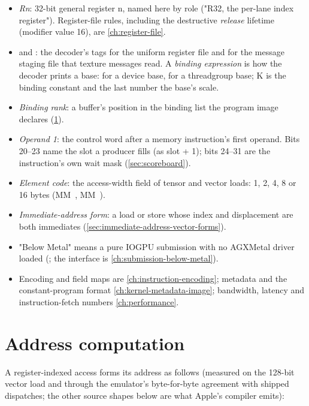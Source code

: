\begin{itemize}
\item \emph{Rn}: 32-bit general register n, named here by role ("R32, the per-lane index register"). Register-file rules,
  including the destructive \emph{release} lifetime (modifier value 16), are \cref{ch:register-file}.
\item \emph{} and \emph{}: the decoder's tags for the uniform register file and for the message staging file that texture
  messages read. A \emph{binding expression} is how the decoder prints a base:  for a device base,
   for a threadgroup base; K is the binding constant and the last number the base's scale.
\item \emph{Binding rank}: a buffer's position in the binding list the program image declares (\cref{sec:address-computation}).
\item \emph{Operand 1}: the control word after a memory instruction's first operand. Bits 20–23 name the slot a producer fills
  (as slot + 1); bits 24–31 are the instruction's own wait mask (\cref{sec:scoreboard}).
\item \emph{Element code}: the access-width field of tensor and vector loads: 1, 2, 4, 8 or 16 bytes (MM~, MM~).
\item \emph{Immediate-address form}: a load or store whose index and displacement are both immediates (\cref{sec:immediate-address-vector-forms}).
\item "Below Metal" means a pure IOGPU submission with no AGXMetal driver loaded
  (; the interface is \cref{ch:submission-below-metal}).
\item Encoding and field maps are \cref{ch:instruction-encoding}; metadata and the constant-program format \cref{ch:kernel-metadata-image}; bandwidth, latency and
  instruction-fetch numbers \cref{ch:performance}.
\end{itemize}

\section{Address computation}\label{sec:address-computation}

A register-indexed access forms its address as follows (measured on the 128-bit vector load and through the emulator's
byte-for-byte agreement with shipped dispatches; the other source shapes below are what Apple's compiler emits):

